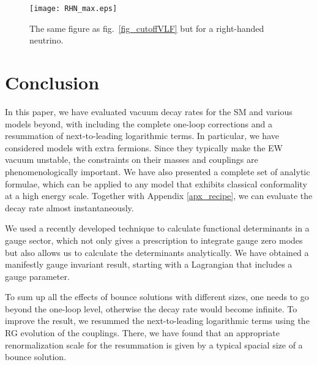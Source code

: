\documentclass[12pt]{article}
\begin{document}
\begin{figure}[t]
 \begin{center}
  \texttt{[image: RHN\_max.eps]}
 \end{center}
 \caption{The same figure as fig.\ \ref{fig_cutoffVLF} but for a
   right-handed neutrino.  }  \label{fig_cutoffRHN}
\end{figure}

\section{Conclusion}
\label{sec_conclusion}
\setcounter{equation}{0}


In this paper, we have evaluated vacuum decay rates for the SM and
various models beyond, with including the complete one-loop corrections
and a resummation of next-to-leading logarithmic terms. In particular, we
have considered models with extra fermions. Since they typically make
the EW vacuum unstable, the constraints on their masses and couplings
are phenomenologically important. We have also presented a complete set
of analytic formulae, which can be applied to any model that exhibits
classical conformality at a high energy scale. Together with Appendix
\ref{apx_recipe}, we can evaluate the decay rate almost instantaneously.

We used a recently developed technique to calculate functional
determinants in a gauge sector, which not only gives a prescription to
integrate gauge zero modes but also allows us to calculate the
determinants analytically. We have obtained a manifestly gauge invariant
result, starting with a Lagrangian that includes a gauge parameter.

To sum up all the effects of bounce solutions with different sizes, one
needs to go beyond the one-loop level, otherwise the decay rate would
become infinite. To improve the result, we resummed the next-to-leading
logarithmic terms using the RG evolution of the couplings. There, we
have found that an appropriate renormalization scale for the resummation
is given by a typical spacial size of a bounce solution.
\end{document}
